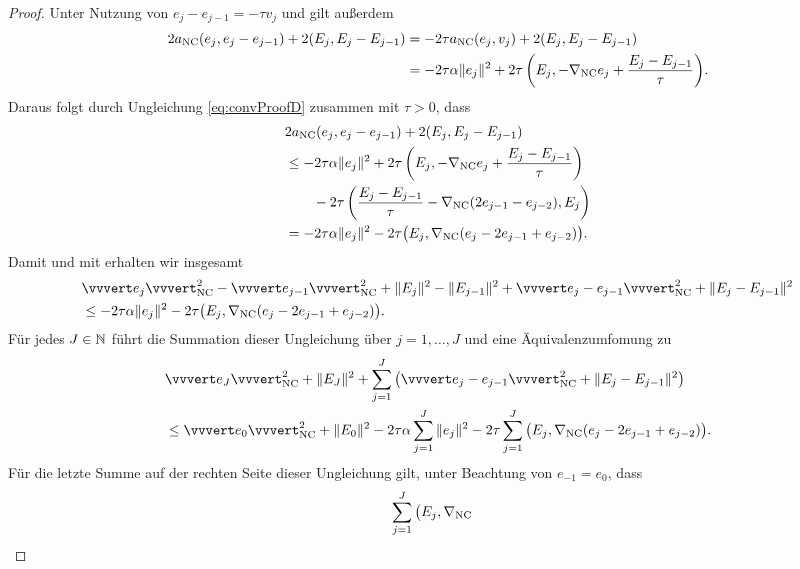 \begin{proof}
  Unter Nutzung von $e_j-e_{j-1}=-\tau v_j$ und  
  gilt außerdem
  \begin{align*}
    2a_{\textup{NC}}(e_j,e_j-e_{j-1}) + 2(E_j,E_j-E_{j-1})
    &=
    -2\tau a_{\textup{NC}}(e_j,v_j) + 2(E_j,E_j-E_{j-1})\\
    &=
    -2\tau\alpha\Vert e_j\Vert^2 + 2\tau\left(E_j,
    -\nabla_{\textup{NC}} e_j+\frac{E_j-E_{j-1}}{\tau}\right)\!.
  \end{align*}
  Daraus folgt durch Ungleichung \eqref{eq:convProofD} zusammen mit $\tau>0$,
  dass
  \begin{align*}
    &2a_{\textup{NC}}(e_j,e_j-e_{j-1}) + 2(E_j,E_j-E_{j-1})\\
    &\leq
    -2\tau\alpha\Vert e_j\Vert^2 + 2\tau\left(E_j,
    -\nabla_{\textup{NC}} e_j+\frac{E_j-E_{j-1}}{\tau}\right)\\
    &\quad\quad-2\tau\left( \frac{E_j-E_{j-1}}{\tau}
    -\nabla_\textup{NC}(2e_{j-1}-e_{j-2}),E_j\right)\\
    &=
    -2\tau\alpha\Vert e_j\Vert^2 - 
    2\tau\big(E_j,\nabla_\textup{NC}(e_j-2e_{j-1}+e_{j-2})\big).
  \end{align*}
  Damit und mit  erhalten wir insgesamt
  \begin{align*}
    &\vvvert e_j \vvvert^2_\nc   -
    \vvvert e_{j-1}\vvvert_\nc^2 +
    \Vert E_j \Vert^2 - \Vert E_{j-1}\Vert^2 +
    \vvvert e_j-e_{j-1}\vvvert_\nc^2 +
    \Vert E_j - E_{j-1} \Vert^2\\
    &\leq
    -2\tau\alpha\Vert e_j\Vert^2 - 
    2\tau\big(E_j,\gradnc(e_j-2e_{j-1}+e_{j-2})\big).
  \end{align*}
  Für jedes $J\in\mathbb{N}$ führt die Summation dieser Ungleichung über
  $j=1,\ldots,J$ und eine Äquivalenzumfomung zu
  \begin{equation}
    \label{eq:convProofF}
    \begin{aligned}
      &\vvvert e_J \vvvert^2_\nc +\Vert E_J \Vert^2 
      +\sum_{j=1}^J\left(\vvvert e_j-e_{j-1} \vvvert_\nc^2 + 
      \Vert E_j-E_{j-1}\Vert^2\right)\\
      &\leq 
      \vvvert e_0 \vvvert_\nc^2 + \Vert E_0 \Vert^2 
      -2\tau\alpha\sum_{j=1}^J \Vert e_j\Vert^2 
      -2\tau \sum_{j=1}^J\big(E_j,\gradnc
      (e_j-2e_{j-1}+e_{j-2})\big).
    \end{aligned}
  \end{equation}
  Für die letzte Summe auf der rechten Seite dieser Ungleichung gilt, unter
  Beachtung von $e_{-1}=e_0$, dass
  \begin{align*}
    &\sum_{j=1}^J\big(E_j,\gradnc

\end{align*}
\end{proof}
